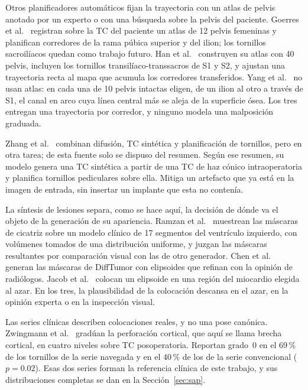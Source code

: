 Otros planificadores automáticos fijan la trayectoria con un atlas de pelvis anotado por un experto o con una búsqueda sobre la pelvis del paciente. Goerres et al.~\cite{goerres2017planning} registran sobre la TC del paciente un atlas de 12 pelvis femeninas y planifican corredores de la rama púbica superior y del ilion; los tornillos sacroilíacos quedan como trabajo futuro. Han et al.~\cite{han2019atlasplanning} construyen su atlas con 40 pelvis, incluyen los tornillos transilíaco-transsacros de S1 y S2, y ajustan una trayectoria recta al mapa que acumula los corredores transferidos. Yang et al.~\cite{yang2022computeraided} no usan atlas: en cada una de 10 pelvis intactas eligen, de un ilion al otro a través de S1, el canal en arco cuya línea central más se aleja de la superficie ósea. Los tres entregan una trayectoria por corredor, y ninguno modela una malposición graduada.

Zhang et al.~\cite{zhang2026pediclescrew} combinan difusión, TC sintética y planificación de tornillos, pero en otra tarea; de esta fuente solo se dispuso del resumen. Según ese resumen, su modelo genera una TC sintética a partir de una TC de haz cónico intraoperatoria y planifica tornillos pediculares sobre ella. Mitiga un artefacto que ya está en la imagen de entrada, sin insertar un implante que esta no contenía.

La síntesis de lesiones separa, como se hace aquí, la decisión de dónde va el objeto de la generación de su apariencia. Ramzan et al.~\cite{ramzan2026claim} muestrean las máscaras de cicatriz sobre un modelo clínico de 17 segmentos del ventrículo izquierdo, con volúmenes tomados de una distribución uniforme, y juzgan las máscaras resultantes por comparación visual con las de otro generador. Chen et al.~\cite{chen2024tumorsynthesis} generan las máscaras de DiffTumor con elipsoides que refinan con la opinión de radiólogos. Jacob et al.~\cite{jacob2026lgesynthnet} colocan un elipsoide en una región del miocardio elegida al azar. En los tres, la plausibilidad de la colocación descansa en el azar, en la opinión experta o en la inspección visual.

Las series clínicas describen colocaciones reales, y no una pose canónica. Zwingmann et al.~\cite{zwingmann2009navigated} gradúan la perforación cortical, que aquí se llama brecha cortical, en cuatro niveles sobre TC posoperatoria. Reportan grado~0 en el 69\,\% de los tornillos de la serie navegada y en el 40\,\% de los de la serie convencional ($p = 0.02$). Esas dos series forman la referencia clínica de este trabajo, y sus distribuciones completas se dan en la Sección~\ref{sec:sap}.


